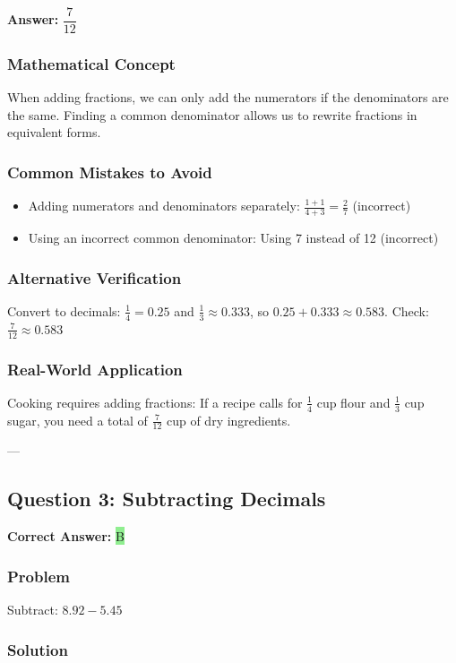 \documentclass[12pt]{article}
\begin{document}
\textbf{Answer: } $\dfrac{7}{12}$

\subsubsection*{Mathematical Concept}
When adding fractions, we can only add the numerators if the denominators are the same. Finding a common denominator allows us to rewrite fractions in equivalent forms.

\subsubsection*{Common Mistakes to Avoid}
\begin{itemize}
\item Adding numerators and denominators separately: $\frac{1+1}{4+3} = \frac{2}{7}$ (incorrect)
\item Using an incorrect common denominator: Using 7 instead of 12 (incorrect)
\end{itemize}

\subsubsection*{Alternative Verification}
Convert to decimals: $\frac{1}{4} = 0.25$ and $\frac{1}{3} \approx 0.333$, so $0.25 + 0.333 \approx 0.583$. Check: $\frac{7}{12} \approx 0.583$ 

\subsubsection*{Real-World Application}
Cooking requires adding fractions: If a recipe calls for $\frac{1}{4}$ cup flour and $\frac{1}{3}$ cup sugar, you need a total of $\frac{7}{12}$ cup of dry ingredients.

---

\subsection{Question 3: Subtracting Decimals}

\textbf{Correct Answer: } \colorbox{lightgreen}{B}

\subsubsection*{Problem}
Subtract: $8.92 - 5.45$

\subsubsection*{Solution}
\end{document}
